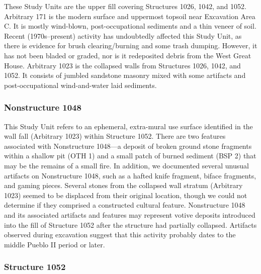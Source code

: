 \documentclass[
  12pt,
]{krantz}
\begin{document}
These Study Units are the upper fill covering Structures 1026, 1042, and
1052. Arbitrary 171 is the modern surface and uppermost topsoil near
Excavation Area C. It is mostly wind-blown, post-occupational sediments
and a thin veneer of soil. Recent (1970s--present) activity has
undoubtedly affected this Study Unit, as there is evidence for brush
clearing/burning and some trash dumping. However, it has not been bladed
or graded, nor is it redeposited debris from the West Great House.
Arbitrary 1023 is the collapsed walls from Structures 1026, 1042, and
1052. It consists of jumbled sandstone masonry mixed with some artifacts
and post-occupational wind-and-water laid sediments.

\hypertarget{nonstructure-1048}{%
\subsubsection{Nonstructure 1048}\label{nonstructure-1048}}

This Study Unit refers to an ephemeral, extra-mural use surface
identified in the wall fall (Arbitrary 1023) within Structure 1052.
There are two features associated with Nonstructure 1048---a deposit of
broken ground stone fragments within a shallow pit (OTH 1) and a small
patch of burned sediment (BSP 2) that may be the remains of a small
fire. In addition, we documented several unusual artifacts on
Nonstructure 1048, such as a hafted knife fragment, biface fragments,
and gaming pieces. Several stones from the collapsed wall stratum
(Arbitrary 1023) seemed to be displaced from their original location,
though we could not determine if they comprised a constructed cultural
feature. Nonstructure 1048 and its associated artifacts and features may
represent votive deposits introduced into the fill of Structure 1052
after the structure had partially collapsed. Artifacts observed during
excavation suggest that this activity probably dates to the middle
Pueblo II period or later.

\hypertarget{structure-1052}{%
\subsubsection{Structure 1052}\label{structure-1052}}
\end{document}
